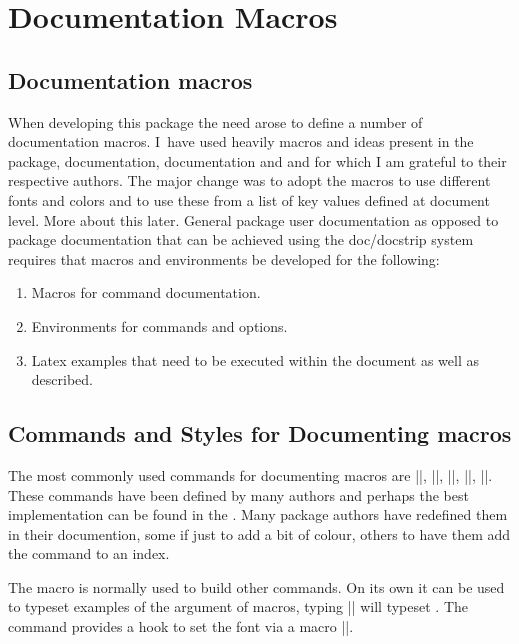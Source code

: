 \thispagestyle{plain}

\chapter{Documentation Macros}


\section{Documentation macros}

When developing this package the need arose to define a number of documentation macros. I~have used heavily macros and ideas present in the  package,  documentation,  documentation  and  and for which I am grateful to their respective authors. The major change was to adopt the macros to use different fonts and colors and to use these from a list of key values defined at document level. More about this later. General package user documentation as opposed to package documentation that can be achieved using the doc/docstrip system requires that macros and environments be developed for the following:

\begin{enumerate}
\item Macros for command documentation.
\item Environments for commands and options.
\item Latex examples that need to be executed within the document as well as described.
\end{enumerate}


\section{Commands and Styles for Documenting macros}

The most commonly used commands for documenting macros are |\cs|, |\cmd|, |\meta|, |\marg|, |\oarg|. These commands have been defined by many authors and perhaps the best implementation can be found in the . Many package authors have redefined them in their documention, some if just to add a bit of colour, others to have them add the command to an index. 

\begin{macro}{\meta}
The macro  is normally used to build other commands. On its own it can be used to typeset
examples of the argument of macros, typing || will typeset . The command provides a hook to set the font via a macro |\meta@font@select|. 
\end{macro}


